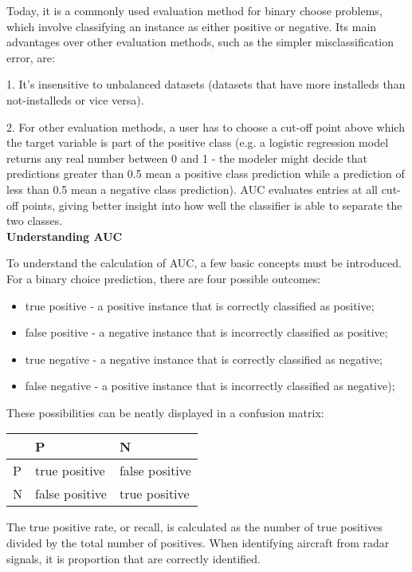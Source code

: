 \documentclass[11pt]{article}
\begin{document}
\begin{singlespacing}
Today, it is a commonly used evaluation method for binary choose problems, which involve classifying an instance as either positive or negative. Its main advantages over other evaluation methods, such as the simpler misclassification error, are:  

1. It's insensitive to unbalanced datasets (datasets that have more installeds than not-installeds or vice versa).

2. For other evaluation methods, a user has to choose a cut-off point above which the target variable is part of the positive class (e.g. a logistic regression model returns any real number between 0 and 1 - the modeler might decide that predictions greater than 0.5 mean a positive class prediction while a prediction of less than 0.5 mean a negative class prediction). AUC evaluates entries at all cut-off points, giving better insight into how well the classifier is able to separate the two classes. \\

\textbf{Understanding AUC}

To understand the calculation of AUC, a few basic concepts must be introduced. For a binary choice prediction, there are four possible outcomes:
\begin{itemize}
\item true positive - a positive instance that is correctly classified as positive;
\item false positive - a negative instance that is incorrectly classified as positive;
\item true negative - a negative instance that is correctly classified as negative;
\item false negative - a positive instance that is incorrectly classified as negative);
\end{itemize}

These possibilities can be neatly displayed in a confusion matrix:

\begin{center}
\begin{tabular}{|l|l|l|}
\hline
  & P             & N \\ \hline
P & true positive & false positive \\ \hline
N & false positive & true positive \\
\hline
\end{tabular}
\end{center}

The true positive rate, or recall, is calculated as the number of true positives divided by the total number of positives. When identifying aircraft from radar signals, it is proportion that are correctly identified.


\end{singlespacing}
\end{document}
